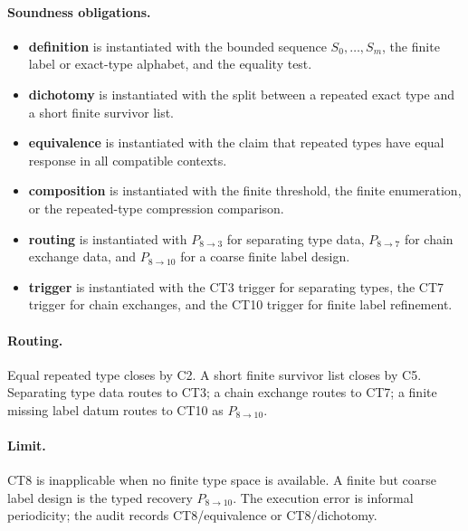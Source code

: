\documentclass[
  11pt,
]{article}
\providecommand{\tightlist}{%
  \setlength{\itemsep}{0pt}\setlength{\parskip}{0pt}}
\theoremstyle{definition}
\newcommand{\ctpar}[1]{\paragraph{#1.}}
\begin{document}
\ctpar{Soundness obligations}
\begin{itemize}
\tightlist
\item \textbf{definition} is instantiated with the bounded sequence \(S_0,\ldots,S_m\), the finite label or exact-type alphabet, and the equality test.
\item \textbf{dichotomy} is instantiated with the split between a repeated exact type and a short finite survivor list.
\item \textbf{equivalence} is instantiated with the claim that repeated types have equal response in all compatible contexts.
\item \textbf{composition} is instantiated with the finite threshold, the finite enumeration, or the repeated-type compression comparison.
\item \textbf{routing} is instantiated with \(P_{8\to3}\) for separating type data, \(P_{8\to7}\) for chain exchange data, and \(P_{8\to10}\) for a coarse finite label design.
\item \textbf{trigger} is instantiated with the CT3 trigger for separating types, the CT7 trigger for chain exchanges, and the CT10 trigger for finite label refinement.
\end{itemize}

\ctpar{Routing}
Equal repeated type closes by C2.  A short finite survivor list closes by
C5.  Separating type data routes to CT3; a chain exchange routes to CT7;
a finite missing label datum routes to CT10 as \(P_{8\to10}\).

\ctpar{Limit}
CT8 is inapplicable when no finite type space is available. A finite but
coarse label design is the typed recovery \(P_{8\to10}\).  The execution
error is informal periodicity; the audit records CT8/equivalence or CT8/dichotomy.
\end{document}
